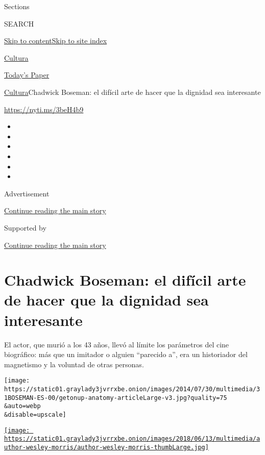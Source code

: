 Sections

SEARCH

\protect\hyperlink{site-content}{Skip to
content}\protect\hyperlink{site-index}{Skip to site index}

\href{https://www.nytimes3xbfgragh.onion/es/section/cultura}{Cultura}

\href{https://myaccount.nytimes3xbfgragh.onion/auth/login?response_type=cookie\&client_id=vi}{}

\href{https://www.nytimes3xbfgragh.onion/section/todayspaper}{Today's
Paper}

\href{/es/section/cultura}{Cultura}\textbar{}Chadwick Boseman: el
difícil arte de hacer que la dignidad sea interesante

\url{https://nyti.ms/3beH4b9}

\begin{itemize}
\item
\item
\item
\item
\item
\item
\end{itemize}

Advertisement

\protect\hyperlink{after-top}{Continue reading the main story}

Supported by

\protect\hyperlink{after-sponsor}{Continue reading the main story}

\hypertarget{chadwick-boseman-el-difuxedcil-arte-de-hacer-que-la-dignidad-sea-interesante}{%
\section{Chadwick Boseman: el difícil arte de hacer que la dignidad sea
interesante}\label{chadwick-boseman-el-difuxedcil-arte-de-hacer-que-la-dignidad-sea-interesante}}

El actor, que murió a los 43 años, llevó al límite los parámetros del
cine biográfico: más que un imitador o alguien ``parecido a'', era un
historiador del magnetismo y la voluntad de otras personas.

\texttt{[image: https://static01.graylady3jvrrxbe.onion/images/2014/07/30/multimedia/31BOSEMAN-ES-00/getonup-anatomy-articleLarge-v3.jpg?quality=75\\\&auto=webp\\\&disable=upscale]}

\href{https://www.nytimes3xbfgragh.onion/by/wesley-morris}{\texttt{[image: https://static01.graylady3jvrrxbe.onion/images/2018/06/13/multimedia/author-wesley-morris/author-wesley-morris-thumbLarge.jpg]}}

